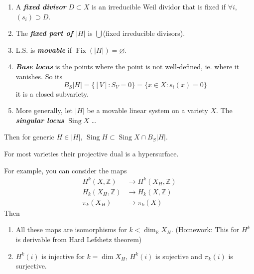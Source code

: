 \documentclass{article}
\newcommand{\R}{\mathbb{R}}
\newcommand{\Z}{\mathbb{Z}}
\DeclareMathOperator{\Sing}{Sing}
\DeclareMathOperator{\Fix}{Fix}
\begin{document}
\begin{defn}\leavevmode
	\begin{enumerate}
		\item A \textbf{\textit{fixed divisor}} $D\subset X$ is an irreducible Weil dividor that is fixed if $\forall i$, $(s_i)\supset D$.
	
		\item The \textbf{\textit{fixed part of $|H|$}} is  $\bigcup$(fixed irreducible divisors).
		
		\item L.S. is \textbf{\textit{movable}} if $\Fix(|H|)=\varnothing$.
		
		\item \textbf{\textit{Base locus}} is the points where the point is not well-defined, ie. where it vanishes. So its \[B_S|H|=\{[V]:S_V=0\}=\{x\in X:s_i(x)=0\}\]
		it is a closed subvariety.
		
		\item More generally, let $|H|$ be a movable linear system on a variety $X$. The \textbf{\textit{singular locus}} $\Sing X$ …
	\end{enumerate}
\end{defn}
\begin{thm}
	Then for generic $H\in|H|$, $\Sing H\subset\Sing X\cap B_S|H|$.
\end{thm}
For most varieties their projective dual is a hypersurface.
\begin{thm}[Lefshetz]
	For example, you can consider the maps
	\begin{align*}
		H^k(X,\Z)&\to H^k(X_H,\Z)\\
		H_k(X_H,\Z)&\to H_k(X,\Z)\\
		\pi_k(X_H)&\to\pi_k(X)
	\end{align*}
	Then
	\begin{enumerate}
		\item All these maps are isomorphisms for $k<\dim_{\R}X_H$. {\color{magenta}(Homework: This for $H^k$ is derivable from Hard Lefshetz theorem)}
		\item $H^k(i)$ is injective for $k=\dim X_H$, $H^k(i)$ is sujective and $\pi_k(i)$ is surjective.
	\end{enumerate}
\end{thm}
\end{document}
